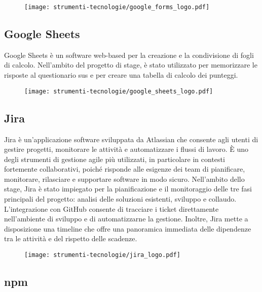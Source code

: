 \begin{figure}[H]
    \centering 
    \texttt{[image: strumenti-tecnologie/google\_forms\_logo.pdf]} 
\end{figure}

\subsection*{Google Sheets}

\par Google Sheets è un software web-based per la creazione e la condivisione di fogli di calcolo. Nell’ambito del progetto di stage, è stato utilizzato per memorizzare le risposte al questionario \gls{sus} e per creare una tabella di calcolo dei punteggi.

\begin{figure}[H]
    \centering 
    \texttt{[image: strumenti-tecnologie/google\_sheets\_logo.pdf]} 
\end{figure}

\subsection*{Jira}

\par Jira è un'applicazione software sviluppata da Atlassian che consente agli utenti di gestire progetti, monitorare le attività e automatizzare i flussi di lavoro. È uno degli strumenti di gestione agile più utilizzati, in particolare in contesti fortemente collaborativi, poiché risponde alle esigenze dei team di pianificare, monitorare, rilasciare e supportare software in modo sicuro. Nell’ambito dello stage, Jira è stato impiegato per la pianificazione e il monitoraggio delle tre fasi principali del progetto: analisi delle soluzioni esistenti, sviluppo e collaudo. L’integrazione con GitHub consente di tracciare i ticket direttamente nell’ambiente di sviluppo e di automatizzarne la gestione. Inoltre, Jira mette a disposizione una timeline che offre una panoramica immediata delle dipendenze tra le attività e del rispetto delle scadenze.

\begin{figure}[H]
    \centering 
    \texttt{[image: strumenti-tecnologie/jira\_logo.pdf]} 
\end{figure}

\subsection*{npm}

